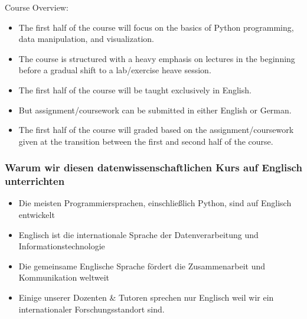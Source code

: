 \documentclass{beamer}
\begin{document}
    \begin{frame}
        Course Overview:
        \begin{itemize}
            \item The first half of the course will focus on the basics of Python programming, data manipulation, and visualization.
            \item The course is structured with a heavy emphasis on lectures in the beginning before a gradual shift to a lab/exercise heave session.
            \item The first half of the course will be taught exclusively in English.
            \item But assignment/coursework can be submitted in either English or German.
            \item The first half of the course will graded based on the assignment/coursework given at the transition between the first and second half of the course.
        \end{itemize}
    \end{frame}
        
    \begin{frame}
        \frametitle{Warum wir diesen datenwissenschaftlichen Kurs auf Englisch unterrichten}
        \begin{itemize}
            \item Die meisten Programmiersprachen, einschließlich Python, sind auf Englisch entwickelt
            \item Englisch ist die internationale Sprache der Datenverarbeitung und Informationstechnologie
            \item Die gemeinsame Englische Sprache fördert die Zusammenarbeit und Kommunikation weltweit
            \item Einige unserer Dozenten \& Tutoren sprechen nur Englisch weil wir ein internationaler Forschungsstandort sind.
        \end{itemize}
    \end{frame}
        
\end{document}
